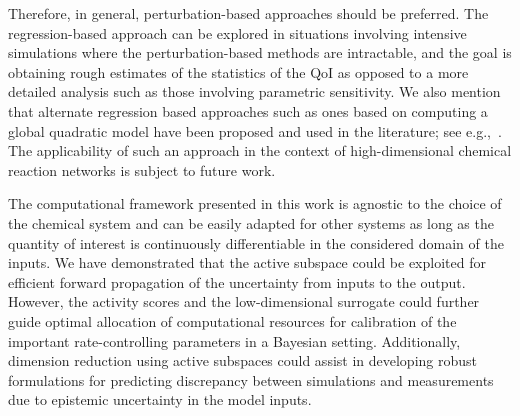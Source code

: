 %
Therefore, in general, perturbation-based approaches should be preferred. The
regression-based approach can be explored in situations involving intensive
simulations where the perturbation-based methods are intractable, and the goal
is obtaining rough estimates of the statistics of the QoI as opposed to a more
detailed analysis such as those involving parametric sensitivity.  We also
mention that alternate regression based approaches such as ones based on
computing a global quadratic model have been proposed and used in the
literature; see e.g.,~\cite{Constantine:2017a}. The applicability of such an
approach in the context of high-dimensional chemical reaction networks is
subject to future work. 

The computational framework presented in this work is agnostic to the choice of
the chemical system and can be easily adapted for other systems as long
as the quantity of interest is continuously differentiable in the considered
domain of the inputs.  We have demonstrated that the active subspace could be
exploited for efficient forward propagation of the uncertainty from inputs to
the output. However, the activity scores and the low-dimensional surrogate
could further guide optimal allocation of computational resources for
calibration of the important rate-controlling parameters in a Bayesian setting.
Additionally, dimension reduction using active subspaces could assist in
developing robust formulations for predicting discrepancy between simulations
and measurements due to epistemic uncertainty in the model inputs.

